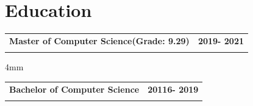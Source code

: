 \documentclass[a4paper,11pt]{article}
\makeatletter
\newcommand{\education}[4]{
\vspace{0mm}\item[]
    \begin{tabular*}{\textwidth}[t]{l@{\extracolsep{\fill}}r}
        \hspace{-4mm} \small\textbf{#1} & {\footnotesize{#3}}\vspace{-1.2mm}\\
        \hspace{-4mm} \footnotesize{\text{#2}} & \footnotesize{#4}
    \end{tabular*}
    \vspace{-5mm}
}
\makeatother
\begin{document}
\section{Education}

\education
{Master of Computer Science(Grade: 9.29)} 
{Mumbai University}
{\textbf{2019- 2021}} 

\vspace{4mm}



\education
{Bachelor of Computer Science} 
{Mumbai University}
{\textbf{20116- 2019}} 
{\textbf{}}




\end{document}
